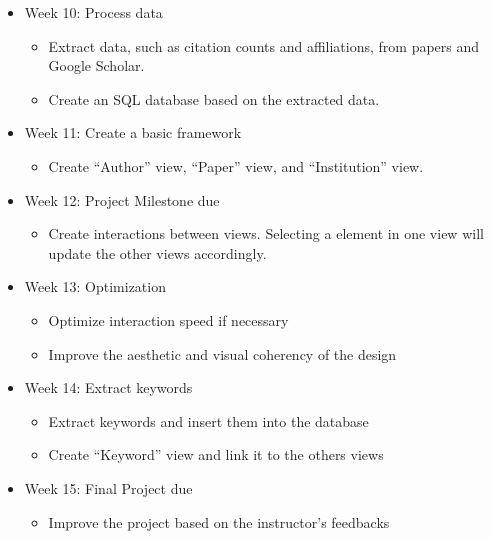 \begin{itemize}
	\item Week 10: Process data
	\begin{itemize}
		\item Extract data, such as citation counts and affiliations, from papers and Google Scholar.
		\item Create an SQL database based on the extracted data.
	\end{itemize}
	\item Week 11: Create a basic framework
	\begin{itemize}
		\item Create ``Author'' view, ``Paper'' view, and ``Institution'' view.
	\end{itemize}
	\item Week 12: Project Milestone due
	\begin{itemize}
		\item Create interactions between views. Selecting a element in one view will update the other views accordingly.
	\end{itemize}
	\item Week 13: Optimization
	\begin{itemize}
		\item Optimize interaction speed if necessary
		\item Improve the aesthetic and visual coherency of the design
	\end{itemize}
	\item Week 14: Extract keywords 
	\begin{itemize}
		\item Extract keywords and insert them into the database
		\item Create ``Keyword'' view and link it to the others views
	\end{itemize}
	\item Week 15: Final Project due
	\begin{itemize} 
		\item Improve the project based on the instructor's feedbacks 		
	\end{itemize} 
\end{itemize}